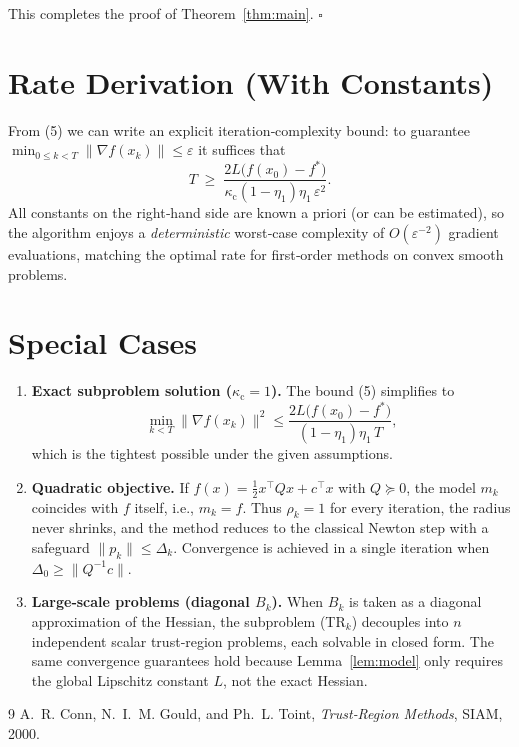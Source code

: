 \documentclass{article}
\begin{document}
This completes the proof of Theorem~\ref{thm:main}. \hfill $\square$

\section*{Rate Derivation (With Constants)}
From (5) we can write an explicit iteration‑complexity bound:
to guarantee $\min_{0\le k<T}\|\nabla f(x_{k})\|\le\varepsilon$ it suffices that
\[
T\;\ge\;
\frac{2L\bigl(f(x_{0})-f^{*}\bigr)}
     {\kappa_{\mathrm{c}}(1-\eta_{1})\eta_{1}\,\varepsilon^{2}} .
\]
All constants on the right‑hand side are known a priori (or can be estimated),
so the algorithm enjoys a \emph{deterministic} worst‑case complexity of
$O(\varepsilon^{-2})$ gradient evaluations, matching the optimal rate for
first‑order methods on convex smooth problems.

\section*{Special Cases}
\begin{enumerate}[label=\alph*)]
\item \textbf{Exact subproblem solution ($\kappa_{\mathrm{c}}=1$).}
The bound (5) simplifies to
\[
\min_{k<T}\|\nabla f(x_{k})\|^{2}
\le
\frac{2L\bigl(f(x_{0})-f^{*}\bigr)}
     {(1-\eta_{1})\eta_{1}\,T},
\]
which is the tightest possible under the given assumptions.

\item \textbf{Quadratic objective.}
If $f(x)=\tfrac12 x^{\top}Qx+ c^{\top}x$ with $Q\succeq 0$,
the model $m_{k}$ coincides with $f$ itself, i.e., $m_{k}=f$.
Thus $\rho_{k}=1$ for every iteration, the radius never shrinks, and the method
reduces to the classical Newton step with a safeguard $\|p_{k}\|\le\Delta_{k}$.
Convergence is achieved in a single iteration when $\Delta_{0}\ge\|Q^{-1}c\|$.

\item \textbf{Large‐scale problems (diagonal $B_{k}$).}
When $B_{k}$ is taken as a diagonal approximation of the Hessian,
the subproblem (TR$_k$) decouples into $n$ independent scalar trust‑region
problems, each solvable in closed form.  The same convergence guarantees hold
because Lemma~\ref{lem:model} only requires the global Lipschitz constant $L$,
not the exact Hessian.
\end{enumerate}

\begin{thebibliography}{9}
A.~R. Conn, N.~I.~M. Gould, and Ph.~L. Toint,
\emph{Trust‑Region Methods},
SIAM, 2000.
\end{thebibliography}
\end{document}
